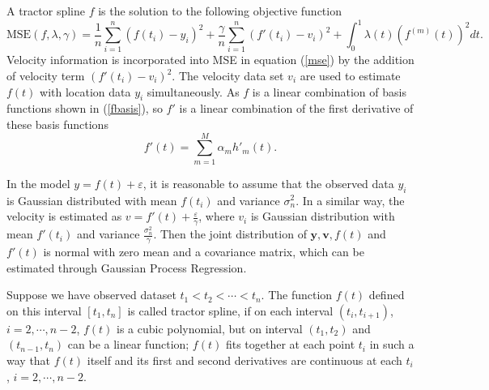 A tractor spline $f$ is the solution to the following objective function
\begin{equation}\label{mse2}
\text{MSE}(f,\lambda,\gamma)=\frac{1}{n}\sum_{i=1}^n(f(t_i)-y_i)^2+\frac{\gamma}{n} \sum_{i=1}^n(f'(t_i)-v_i)^2+\int_{0}^{1}\lambda (t)(f^{(m)}(t))^2dt.
\end{equation}
Velocity information is incorporated into MSE in equation (\ref{mse}) by the addition of velocity term $(f'(t_i)-v_i)^2$. The velocity data set $v_i$ are used to estimate $f(t)$ with location data $y_i$ simultaneously. As $f$ is a linear combination of basis functions shown in (\ref{fbasis}), so $f'$ is a linear combination of the first derivative of these basis functions
\begin{equation}
f'(t) =\sum_{m=1}^{M}\alpha_mh'_m(t).
\end{equation}

In the model $y=f(t)+\varepsilon$, it is reasonable to assume that the observed data $y_i$ is Gaussian distributed with mean $f(t_i)$ and variance $\sigma_n^2$. In a similar way, the velocity is estimated as  $v=f'(t)+\frac{\varepsilon}{\gamma}$, where $v_i$ is Gaussian distribution with mean $f'(t_i)$ and variance $\frac{\sigma_n^2}{\gamma}$. Then the joint distribution of $\mathbf{y},\mathbf{v},f(t)$ and $f'(t)$ is normal with zero mean and a covariance matrix, which can be estimated through Gaussian Process Regression.

Suppose we have observed dataset $t_1<t_2<\cdots<t_n$. The function $f(t)$ defined on this interval $[t_1,t_n]$ is called tractor spline, if on each interval $(t_i,t_{i+1})$, $i=2,\cdots,n-2$, $f(t)$ is a cubic polynomial, but on interval $(t_1,t_2)$ and $(t_{n-1},t_n)$ can be a linear function; $f(t)$ fits together at each point $t_i$ in such a way that $f(t)$ itself and its first and second derivatives are continuous at each $t_i$,  $i=2,\cdots,n-2$.  

